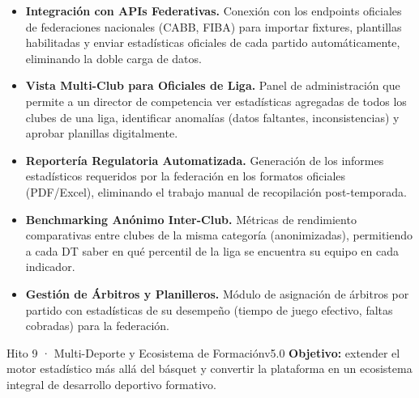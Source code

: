 \documentclass[11pt,a4paper]{article}
\begin{document}
\begin{itemize}
  \item \textbf{Integración con APIs Federativas.} Conexión con los endpoints oficiales de federaciones nacionales (CABB, FIBA) para importar fixtures, plantillas habilitadas y enviar estadísticas oficiales de cada partido automáticamente, eliminando la doble carga de datos.

  \item \textbf{Vista Multi-Club para Oficiales de Liga.} Panel de administración que permite a un director de competencia ver estadísticas agregadas de todos los clubes de una liga, identificar anomalías (datos faltantes, inconsistencias) y aprobar planillas digitalmente.

  \item \textbf{Reportería Regulatoria Automatizada.} Generación de los informes estadísticos requeridos por la federación en los formatos oficiales (PDF/Excel), eliminando el trabajo manual de recopilación post-temporada.

  \item \textbf{Benchmarking Anónimo Inter-Club.} Métricas de rendimiento comparativas entre clubes de la misma categoría (anonimizadas), permitiendo a cada DT saber en qué percentil de la liga se encuentra su equipo en cada indicador.

  \item \textbf{Gestión de Árbitros y Planilleros.} Módulo de asignación de árbitros por partido con estadísticas de su desempeño (tiempo de juego efectivo, faltas cobradas) para la federación.
\end{itemize}

\begin{roadbox}{Hito 9 · Multi-Deporte y Ecosistema de Formación}{v5.0}
\small\textcolor{accentlight}{%
  \textbf{Objetivo:} extender el motor estadístico más allá del básquet y convertir la plataforma en un ecosistema integral de desarrollo deportivo formativo.
}
\end{roadbox}
\end{document}
